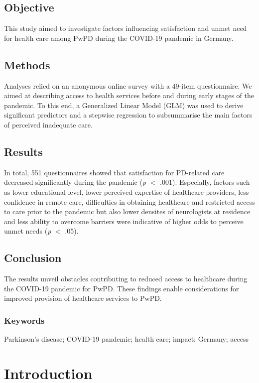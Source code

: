 \documentclass[a4paper,oneside,11pt,english]{scrartcl}
\begin{document}
\subsection*{Objective}
This study aimed to investigate factors influencing satisfaction and unmet need for health care among Pw\textsc{PD} during the \textsc{COVID}-19 pandemic in Germany.
\subsection*{Methods} 
Analyses relied on an anonymous online survey with a 49-item questionnaire. We aimed at describing access to health services before and during early stages of the pandemic. To this end, a Generalized Linear Model (GLM) was used to derive significant predictors and a stepwise regression to subsummarise the main factors of perceived inadequate care.  
\subsection*{Results}
In total, 551 questionnaires showed that satisfaction for \textsc{PD}-related care decreased significantly during the pandemic (\textit{p} $<$ .001). Especially, factors such as lower educational level, lower perceived expertise of healthcare providers, less confidence in remote care, difficulties in obtaining healthcare and restricted access to care prior to the pandemic but also lower densites of neurologists at residence and less ability to overcome barriers were indicative of higher odds to perceive unmet needs (\textit{p} $<$ .05).
\subsection*{Conclusion}
The results unveil obstacles contributing to reduced access to healthcare during the \textsc{COVID}-19 pandemic for PwPD. These findings enable considerations for improved provision of healthcare services to PwPD.
\subsubsection*{Keywords}
\small{Parkinson's disease; \textsc{COVID}-19 pandemic; health care; impact; Germany; access}

\newpage

\section*{Introduction}
\end{document}

